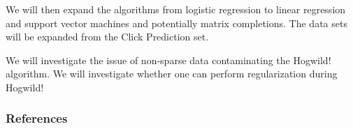 \documentclass{article} %
\begin{document}
We will then expand the algorithms from logistic regression to linear regression and support vector machines and potentially matrix completions. The data sets will be expanded from the Click Prediction set.

We will investigate the issue of non-sparse data contaminating the Hogwild! algorithm. We will investigate whether one can perform regularization during Hogwild!

\subsubsection*{References}

\begingroup
\renewcommand{\section}[2]{}%


\endgroup
\end{document}
